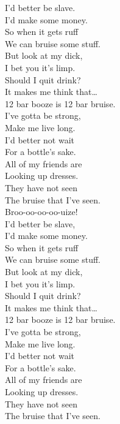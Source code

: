 I'd better be slave. \\
I'd make some money. \\
So when it gets ruff \\
We can bruise some stuff. \\

But look at my dick, \\
I bet you it's limp. \\
Should I quit drink? \\
It makes me think that… \\

12 bar booze is 12 bar bruise. \\

I've gotta be strong, \\
Make me live long. \\
I'd better not wait \\
For a bottle's sake. \\

All of my friends are \\
Looking up dresses. \\
They have not seen \\
The bruise that I've seen. \\

Broo-oo-oo-oo-uize! \\

I'd better be slave, \\
I'd make some money. \\
So when it gets ruff \\
We can bruise some stuff. \\

But look at my dick, \\
I bet you it's limp. \\
Should I quit drink? \\
It makes me think that… \\

12 bar booze is 12 bar bruise. \\

I've gotta be strong, \\
Make me live long. \\
I'd better not wait \\
For a bottle's sake. \\

All of my friends are \\
Looking up dresses. \\
They have not seen \\
The bruise that I've seen. \\


